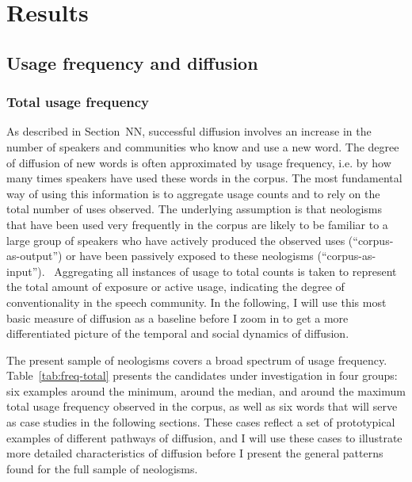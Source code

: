 \documentclass[
  a4paper,
  abstract=on,
  captions=tableabove
  ]{scrartcl}
\begin{document}
\section{Results}
  \label{sec:results}

  \subsection{Usage frequency and diffusion}
    \label{subsec:freq}

    \subsubsection{Total usage frequency}
      \label{subsec:total-freq}

      As described in Section~NN, successful diffusion involves an increase in the number of speakers and communities who know and use a new word. The degree of diffusion of new words is often approximated by usage frequency, i.e. by how many times speakers have used these words in the corpus. The most fundamental way of using this information is to aggregate usage counts and to rely on the total number of uses observed. The underlying assumption is that neologisms that have been used very frequently in the corpus are likely to be familiar to a large group of speakers who have actively produced the observed uses (\enquote{corpus-as-output}) or have been passively exposed to these neologisms (\enquote{corpus-as-input}).~\parencite{Stefanowitsch2017CorpusbasedPerspective} Aggregating all instances of usage to total counts is taken to represent the total amount of exposure or active usage, indicating the degree of conventionality in the speech community. In the following, I will use this most basic measure of diffusion as a baseline before I zoom in to get a more differentiated picture of the temporal and social dynamics of diffusion.

      The present sample of neologisms covers a broad spectrum of usage frequency. Table~\ref{tab:freq-total} presents the candidates under investigation in four groups: six examples around the minimum, around the median, and around the maximum total usage frequency observed in the corpus, as well as six words that will serve as case studies in the following sections. These cases reflect a set of prototypical examples of different pathways of diffusion, and I will use these cases to illustrate more detailed characteristics of diffusion before I present the general patterns found for the full sample of neologisms.
\end{document}
